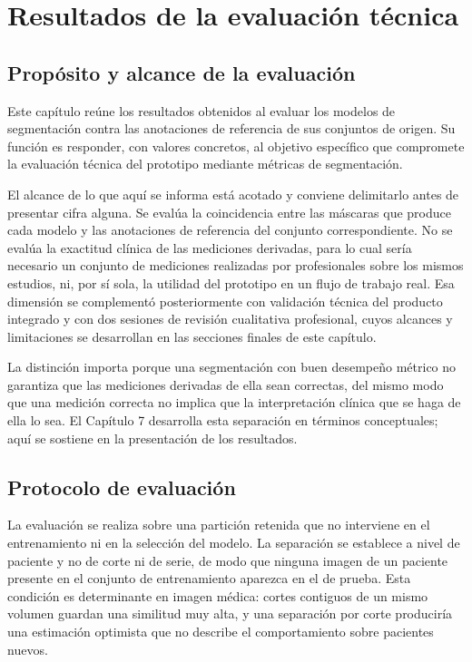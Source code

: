 \chapter{Resultados de la evaluación técnica}
\label{chap:resultados-evaluacion}

\section{Propósito y alcance de la evaluación}

Este capítulo reúne los resultados obtenidos al evaluar los modelos de segmentación contra las anotaciones de referencia de sus conjuntos de origen. Su función es responder, con valores concretos, al objetivo específico que compromete la evaluación técnica del prototipo mediante métricas de segmentación.

El alcance de lo que aquí se informa está acotado y conviene delimitarlo antes de presentar cifra alguna. Se evalúa la coincidencia entre las máscaras que produce cada modelo y las anotaciones de referencia del conjunto correspondiente. No se evalúa la exactitud clínica de las mediciones derivadas, para lo cual sería necesario un conjunto de mediciones realizadas por profesionales sobre los mismos estudios, ni, por sí sola, la utilidad del prototipo en un flujo de trabajo real. Esa dimensión se complementó posteriormente con validación técnica del producto integrado y con dos sesiones de revisión cualitativa profesional, cuyos alcances y limitaciones se desarrollan en las secciones finales de este capítulo.

La distinción importa porque una segmentación con buen desempeño métrico no garantiza que las mediciones derivadas de ella sean correctas, del mismo modo que una medición correcta no implica que la interpretación clínica que se haga de ella lo sea. El Capítulo 7 desarrolla esta separación en términos conceptuales; aquí se sostiene en la presentación de los resultados.

\section{Protocolo de evaluación}

La evaluación se realiza sobre una partición retenida que no interviene en el entrenamiento ni en la selección del modelo. La separación se establece a nivel de paciente y no de corte ni de serie, de modo que ninguna imagen de un paciente presente en el conjunto de entrenamiento aparezca en el de prueba. Esta condición es determinante en imagen médica: cortes contiguos de un mismo volumen guardan una similitud muy alta, y una separación por corte produciría una estimación optimista que no describe el comportamiento sobre pacientes nuevos.

